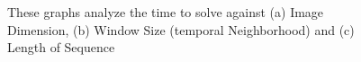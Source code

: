 \begin{figure}[t]
\begin{centering}
\caption{These graphs analyze the time to solve against (a) Image Dimension, 
(b) Window Size (temporal Neighborhood) and (c) Length of Sequence }
\par\end{centering}
\end{figure}

%
%
%
